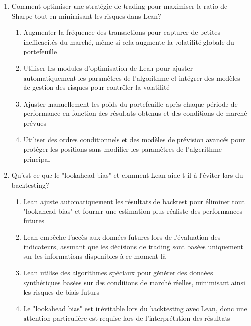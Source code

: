 \documentclass[a4paper,12pt]{article}
\begin{document}
\begin{enumerate}
    \item Comment optimiser une stratégie de trading pour maximiser le ratio de Sharpe tout en minimisant les risques dans Lean?
    \begin{enumerate}[label=(\Alph*)]
        \item Augmenter la fréquence des transactions pour capturer de petites inefficacités du marché, même si cela augmente la volatilité globale du portefeuille
        \item Utiliser les modules d'optimisation de Lean pour ajuster automatiquement les paramètres de l'algorithme et intégrer des modèles de gestion des risques pour contrôler la volatilité
        \item Ajuster manuellement les poids du portefeuille après chaque période de performance en fonction des résultats obtenus et des conditions de marché prévues
        \item Utiliser des ordres conditionnels et des modèles de prévision avancés pour protéger les positions sans modifier les paramètres de l'algorithme principal
    \end{enumerate}

    \item Qu'est-ce que le "lookahead bias" et comment Lean aide-t-il à l'éviter lors du backtesting?
    \begin{enumerate}[label=(\Alph*)]
        \item Lean ajuste automatiquement les résultats de backtest pour éliminer tout "lookahead bias" et fournir une estimation plus réaliste des performances futures
        \item Lean empêche l'accès aux données futures lors de l'évaluation des indicateurs, assurant que les décisions de trading sont basées uniquement sur les informations disponibles à ce moment-là
        \item Lean utilise des algorithmes spéciaux pour générer des données synthétiques basées sur des conditions de marché réelles, minimisant ainsi les risques de biais futurs
        \item Le "lookahead bias" est inévitable lors du backtesting avec Lean, donc une attention particulière est requise lors de l'interprétation des résultats
    \end{enumerate}


\end{enumerate}
\end{document}
